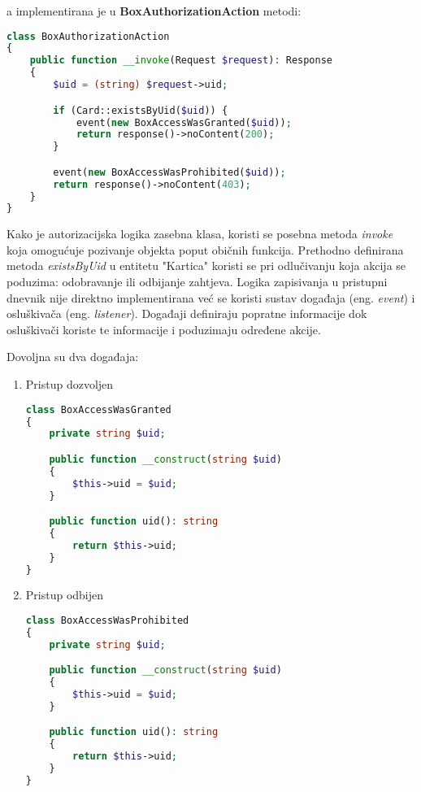 a implementirana je u \textbf{BoxAuthorizationAction} metodi:

\begin{lstlisting}[language=PHP]
class BoxAuthorizationAction
{
    public function __invoke(Request $request): Response
    {
        $uid = (string) $request->uid;

        if (Card::existsByUid($uid)) {
            event(new BoxAccessWasGranted($uid));
            return response()->noContent(200);
        }

        event(new BoxAccessWasProhibited($uid));
        return response()->noContent(403);
    }
}
\end{lstlisting}

Kako je autorizacijska logika zasebna klasa, koristi se posebna metoda \textit{\textunderscore\textunderscore invoke} koja omogućuje pozivanje objekta
poput običnih funkcija.
Prethodno definirana metoda \textit{existsByUid} u entitetu "Kartica" koristi se pri odlučivanju koja akcija se poduzima:
odobravanje ili odbijanje zahtjeva.
Logika zapisivanja u pristupni dnevnik nije direktno implementirana već se koristi sustav događaja (eng. \textit{event})
i osluškivača (eng. \textit{listener}).
Događaji definiraju popratne informacije dok osluškivači koriste te informacije i poduzimaju određene akcije.

\pagebreak

Dovoljna su dva događaja:
\begin{enumerate}
    \item Pristup dozvoljen
        \begin{lstlisting}[language=PHP]
class BoxAccessWasGranted
{
    private string $uid;

    public function __construct(string $uid)
    {
        $this->uid = $uid;
    }

    public function uid(): string
    {
        return $this->uid;
    }
}
        \end{lstlisting}
    \item Pristup odbijen
        \begin{lstlisting}[language=PHP]
class BoxAccessWasProhibited
{
    private string $uid;

    public function __construct(string $uid)
    {
        $this->uid = $uid;
    }

    public function uid(): string
    {
        return $this->uid;
    }
}
        \end{lstlisting}
\end{enumerate}

